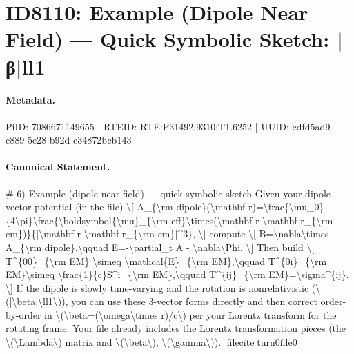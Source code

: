\section*{ID8110: Example (Dipole Near Field) — Quick Symbolic Sketch: |β|ll1}
\paragraph{Metadata.}
PiID: 7086671149655 | RTEID: RTE:P31492.9310:T1.6252 | UUID: cdfd5ad9-c889-5e28-b92d-c34872bcb143

\paragraph{Canonical Statement.}
\# 6) Example (dipole near field) — quick symbolic sketch Given your dipole vector potential (in the file) \textbackslash{}[ A\_\{\textbackslash{}rm dipole\}(\textbackslash{}mathbf r)=\textbackslash{}frac\{\textbackslash{}mu\_0\}\{4\textbackslash{}pi\}\textbackslash{}frac\{\textbackslash{}boldsymbol\{\textbackslash{}mu\}\_\{\textbackslash{}rm eff\}\textbackslash{}times(\textbackslash{}mathbf r-\textbackslash{}mathbf r\_\{\textbackslash{}rm cm\})\}\{|\textbackslash{}mathbf r-\textbackslash{}mathbf r\_\{\textbackslash{}rm cm\}|\textasciicircum{}3\}, \textbackslash{}] compute \textbackslash{}[ B=\textbackslash{}nabla\textbackslash{}times A\_\{\textbackslash{}rm dipole\},\textbackslash{}qquad E=-\textbackslash{}partial\_t A - \textbackslash{}nabla\textbackslash{}Phi. \textbackslash{}] Then build \textbackslash{}[ T\textasciicircum{}\{00\}\_\{\textbackslash{}rm EM\} \textbackslash{}simeq \textbackslash{}mathcal\{E\}\_\{\textbackslash{}rm EM\},\textbackslash{}qquad T\textasciicircum{}\{0i\}\_\{\textbackslash{}rm EM\}\textbackslash{}simeq \textbackslash{}frac\{1\}\{c\}S\textasciicircum{}i\_\{\textbackslash{}rm EM\},\textbackslash{}qquad T\textasciicircum{}\{ij\}\_\{\textbackslash{}rm EM\}=\textbackslash{}sigma\textasciicircum{}\{ij\}. \textbackslash{}] If the dipole is slowly time-varying and the rotation is nonrelativistic (\textbackslash{}(|\textbackslash{}beta|\textbackslash{}ll1\textbackslash{})), you can use these 3-vector forms directly and then correct order-by-order in \textbackslash{}(\textbackslash{}beta=(\textbackslash{}omega\textbackslash{}times r)/c\textbackslash{}) per your Lorentz transform for the rotating frame. Your file already includes the Lorentz transformation pieces (the \textbackslash{}(\textbackslash{}Lambda\textbackslash{}) matrix and \textbackslash{}(\textbackslash{}beta\textbackslash{}), \textbackslash{}(\textbackslash{}gamma\textbackslash{})). fileciteturn0file0

